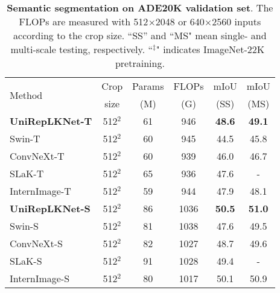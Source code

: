 \documentclass[10pt,twocolumn,letterpaper]{article}
\begin{document}
\begin{table}[t]
    \centering
    \setlength{\tabcolsep}{1.3mm}
    \footnotesize
    \caption{\textbf{Semantic segmentation on ADE20K validation set}. The FLOPs are measured with 512$\times$2048 or 640$\times$2560 inputs according to the crop size. ``SS'' and ``MS" mean single- and multi-scale testing, respectively. ``$^\ddagger$" indicates ImageNet-22K~\cite{deng2009imagenet} pretraining.}
    \vspace{-0.1in}
    \begin{tabular}{l|c|c|c|cc}
    \hline
    \multirow{2}{*}{Method} & Crop & Params & FLOPs & mIoU & mIoU\\
    	& size & (M)&(G) & (SS) & (MS)   \\
    \hline
    \rowcolor{gray!20}
    \textbf{UniRepLKNet-T}    &   512$^2$    & 61   &   946   &   \textbf{48.6}    &   \textbf{49.1}   \\ 
    	Swin-T~\cite{liu2021swin} & 512$^2$ & 60  & 945 & 44.5 & 45.8 \\
    	ConvNeXt-T~\cite{liu2022convnet} & 512$^2$ & 60 & 939 & 46.0 & 46.7 \\
    	SLaK-T~\cite{liu2022more} & 512$^2$ & 65 & 936 & 47.6 & - \\
    	InternImage-T~\cite{wang2023internimage} & 512$^2$ & 59 & 944 & 47.9 & 48.1  \\
     \rowcolor{gray!20}
     
    	\hline
     \rowcolor{gray!20}
        \textbf{UniRepLKNet-S}    &   512$^2$   &   86   &   1036   &   \textbf{50.5}    &   \textbf{51.0}   \\
        Swin-S~\cite{liu2021swin} & 512$^2$ & 81 &  1038 &  47.6 &  49.5 \\
        ConvNeXt-S~\cite{liu2022convnet}  & 512$^2$ &82 & 1027  & 48.7 & 49.6  \\
        SLaK-S~\cite{liu2022more} & 512$^2$ &91 & 1028 & 49.4 & - \\
        InternImage-S~\cite{wang2023internimage} & 512$^2$ & 80 & 1017 & 50.1 & 50.9 \\
        
        


\end{tabular}
\end{table}
\end{document}

